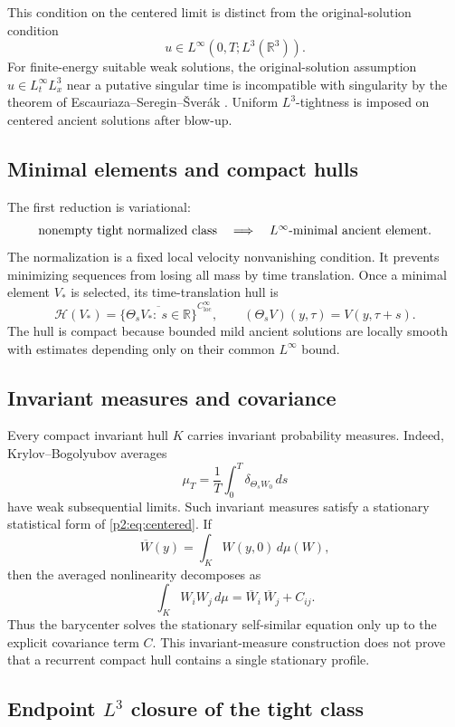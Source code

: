 \documentclass[11pt]{amsart}
\theoremstyle{plain}
\theoremstyle{definition}
\theoremstyle{remark}
\numberwithin{equation}{section}
\newcommand{\R}{\mathbb R}
\newcommand{\loc}{\mathrm{loc}}
\newcommand{\calH}{\mathcal H}
\begin{document}
This condition on the centered limit is distinct from the original-solution condition
\[
   u\in L^\infty(0,T;L^3(\R^3)).
\]
For finite-energy suitable weak solutions, the original-solution assumption
\(u\in L^\infty_tL^3_x\) near a putative singular time is incompatible with
singularity by the theorem of Escauriaza--Seregin--\v{S}ver\'ak
\cite{ESS2003}.  Uniform \(L^3\)-tightness is imposed on centered ancient
solutions after blow-up.

\subsection{Minimal elements and compact hulls}

The first reduction is variational:
\[
   \hbox{nonempty tight normalized class}
   \quad\Longrightarrow\quad
   \hbox{\(L^\infty\)-minimal ancient element}.
\]
The normalization is a fixed local velocity nonvanishing condition.  It
prevents minimizing sequences from losing all mass by time translation.
Once a minimal element \(V_*\) is selected, its time-translation hull is
\[
   \calH(V_*)
   =
   \overline{\{\Theta_sV_*:\ s\in\R\}}^{C^\infty_{\loc}},
   \qquad
   (\Theta_sV)(y,\tau)=V(y,\tau+s).
\]
The hull is compact because bounded mild ancient solutions are locally smooth
with estimates depending only on their common \(L^\infty\) bound.

\subsection{Invariant measures and covariance}

Every compact invariant hull \(K\) carries invariant probability measures.
Indeed, Krylov--Bogolyubov averages
\[
   \mu_T=\frac1T\int_0^T\delta_{\Theta_sW_0}\,ds
\]
have weak subsequential limits.  Such invariant measures satisfy a stationary
statistical form of \eqref{p2:eq:centered}.  If
\[
   \overline W(y)=\int_K W(y,0)\,d\mu(W),
\]
then the averaged nonlinearity decomposes as
\[
   \int_K W_iW_j\,d\mu
   =
   \overline W_i\,\overline W_j+C_{ij}.
\]
Thus the barycenter solves the stationary self-similar equation only up to the
explicit covariance term \(C\).  This invariant-measure construction does
not prove that a recurrent compact hull contains a single stationary profile.

\subsection{\texorpdfstring{Endpoint \(L^3\) closure of the tight class}{Endpoint L3 closure of the tight class}}
\end{document}
